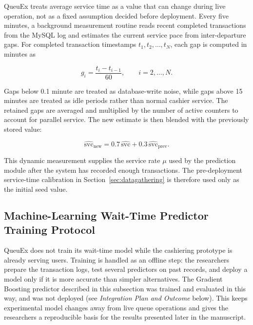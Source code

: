 \documentclass{research}
\newcommand{\sysname}{QueuEx}
\begin{document}
\sysname{} treats average service time as a value that can change
during live operation, not as a fixed assumption decided before
deployment. Every five minutes, a background measurement routine reads
recent completed transactions from the MySQL log and estimates the
current service pace from inter-departure gaps. For completed
transaction timestamps $t_1, t_2, \ldots, t_N$, each gap is computed in
minutes as

\begin{equation}
g_i = \frac{t_i - t_{i-1}}{60}, \qquad i = 2, \ldots, N.
\label{eq:method-svc-gap}
\end{equation}

\noindent Gaps below 0.1 minute are treated as database-write noise,
while gaps above 15 minutes are treated as idle periods rather than
normal cashier service. The retained gaps are averaged and multiplied
by the number of active counters to account for parallel service. The
new estimate is then blended with the previously stored value:

\begin{equation}
\widehat{\mathrm{svc}}_{\text{new}} =
0.7\,\widehat{\mathrm{svc}} +
0.3\,\widehat{\mathrm{svc}}_{\text{prev}}.
\label{eq:method-svc-blend}
\end{equation}

\noindent This dynamic measurement supplies the service rate $\mu$ used
by the prediction module after the system has recorded enough
transactions. The pre-deployment service-time calibration in
Section~\ref{sec:datagathering} is therefore used only as the initial
seed value.

\subsection{Machine-Learning Wait-Time Predictor Training Protocol}
\label{sec:ml-training-protocol}

\sysname{} does not train its wait-time model while the cashiering
prototype is already serving users. Training is handled as an offline
step: the researchers prepare the transaction logs, test several
predictors on past records, and deploy a model only if it is more
accurate than simpler alternatives. The Gradient Boosting predictor
described in this subsection was trained and evaluated in this way, and
was not deployed (see \emph{Integration Plan and Outcome} below). This keeps experimental
model changes away from live queue operations and gives the researchers
a reproducible basis for the results presented later in the manuscript.
\end{document}
